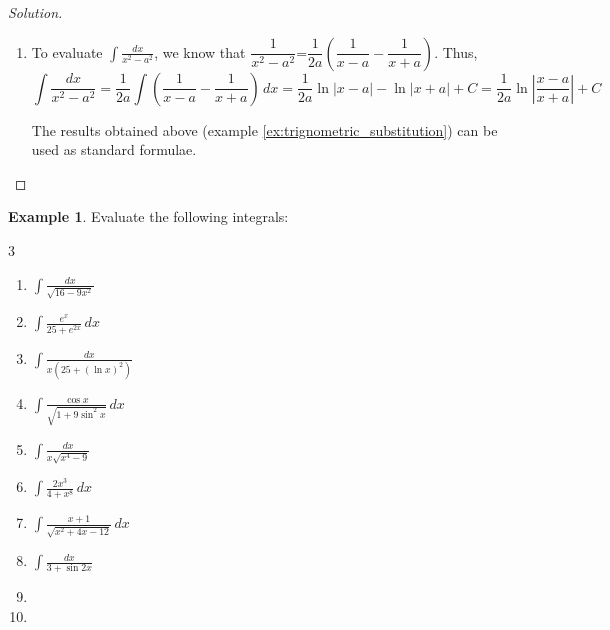 \documentclass{book}
\theoremstyle{definition}
\newtheorem{example}{Example}[section]
\newenvironment{solution}
    {\begin{proof}[Solution]}
    {\end{proof}}
\begin{document}
\begin{solution}
\begin{enumerate}[label=(\roman*)]
\begin{align*}
    \int \frac{dx}{\sqrt{x^2-a^2}} &= \int \frac{a\sec\theta\tan\theta}{\sqrt{a^2\sec^2\theta-a^2}}d\theta = \int \frac{a\sec\theta\tan\theta}{a\tan\theta}d\theta = \int \sec\theta\,d\theta \\
    &= \ln\left|\sec\theta+\tan\theta\right|+C \\
    &= \ln\left|\sec\theta+\sqrt{\sec^2\theta-1}\right|+C \\
    &= \ln\left|\frac{x}{a}+\sqrt{\frac{x^2}{a^2}-1}\right|+C = \ln (x+\sqrt{x^2-a^2})+C_1
\end{align*}
\item To evaluate $\displaystyle\int\frac{dx}{x^2-a^2}$, we know that $\dfrac{1}{x^2-a^2}$=$\dfrac{1}{2a}(\dfrac{1}{x-a}-\dfrac{1}{x+a})$. Thus, 
\[
\int\frac{dx}{x^2-a^2}=\frac{1}{2a}\int(\frac{1}{x-a}-\frac{1}{x+a})\,dx=\frac{1}{2a}\ln|x-a|-\ln|x+a|+C=\frac{1}{2a}\ln\left|\frac{x-a}{x+a}\right|+C
\]

The results obtained above (example \ref{ex:trignometric_substitution}) can be used as standard formulae.

\end{enumerate}
\end{solution}


\begin{example}
Evaluate the following integrals:
\begin{multicols}{3}

\begin{enumerate}[label=(\roman*)]
    \item $\displaystyle\int \frac{dx}{\sqrt{16-9x^2}}$
    \item $\displaystyle\int \frac{e^x}{25+e^{2x}}\,dx$
    \item $\displaystyle\int \frac{dx}{x(25+(\ln x)^2)}$
    \item $\displaystyle\int \frac{\cos x}{\sqrt{1+9\sin^2 x}}\,dx$
    \item $ \displaystyle\int \frac{dx}{x\sqrt{x^4-9}}$
    \item $\displaystyle\int \frac{2x^3}{4+x^8}\,dx$
    \item $\displaystyle\int \frac{x+1}{\sqrt{x^2+4x-12}}\,dx$
    \item $\displaystyle\int\frac{dx}{3+\sin 2x}$
    \item[] \phantom{x}
    \item[] \phantom{x}
   
\end{enumerate}
\end{multicols}    
\end{example}
\end{document}
